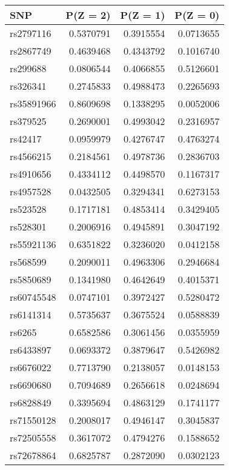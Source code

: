 \documentclass[
]{article}
\theoremstyle{plain}
\begin{document}
{\begin{table}[H]
\begin{minipage}{0.5\linewidth}
  \end{minipage}
  \qquad
  \begin{minipage}{0.5\linewidth}
    \center
    \begin{table}[H]
\centering
\begin{tabular}{lrrr}
\toprule
SNP & P(Z = 2) & P(Z = 1) & P(Z = 0)\\
\midrule
rs2797116 & 0.5370791 & 0.3915554 & 0.0713655\\
rs2867749 & 0.4639468 & 0.4343792 & 0.1016740\\
rs299688 & 0.0806544 & 0.4066855 & 0.5126601\\
rs326341 & 0.2745833 & 0.4988473 & 0.2265693\\
rs35891966 & 0.8609698 & 0.1338295 & 0.0052006\\
\addlinespace
rs379525 & 0.2690001 & 0.4993042 & 0.2316957\\
rs42417 & 0.0959979 & 0.4276747 & 0.4763274\\
rs4566215 & 0.2184561 & 0.4978736 & 0.2836703\\
rs4910656 & 0.4334112 & 0.4498570 & 0.1167317\\
rs4957528 & 0.0432505 & 0.3294341 & 0.6273153\\
\addlinespace
rs523528 & 0.1717181 & 0.4853414 & 0.3429405\\
rs528301 & 0.2006916 & 0.4945891 & 0.3047192\\
rs55921136 & 0.6351822 & 0.3236020 & 0.0412158\\
rs568599 & 0.2090011 & 0.4963306 & 0.2946684\\
rs5850689 & 0.1341980 & 0.4642649 & 0.4015371\\
\addlinespace
rs60745548 & 0.0747101 & 0.3972427 & 0.5280472\\
rs6141314 & 0.5735637 & 0.3675524 & 0.0588839\\
rs6265 & 0.6582586 & 0.3061456 & 0.0355959\\
rs6433897 & 0.0693372 & 0.3879647 & 0.5426982\\
rs6676022 & 0.7713790 & 0.2138057 & 0.0148153\\
\addlinespace
rs6690680 & 0.7094689 & 0.2656618 & 0.0248694\\
rs6828849 & 0.3395694 & 0.4863129 & 0.1741177\\
rs71550128 & 0.2008017 & 0.4946147 & 0.3045837\\
rs72505558 & 0.3617072 & 0.4794276 & 0.1588652\\
rs72678864 & 0.6825787 & 0.2872090 & 0.0302123\\

\end{tabular}
\end{table}
\end{minipage}
\end{table}}
\end{document}
